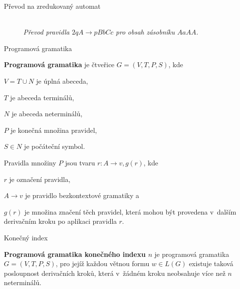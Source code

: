 \documentclass[a4paper,fyma3]{prosper}
\theoremstyle{definition}
\begin{document}
\begin{slide}{Převod na zredukovaný automat}

\bigskip
\bigskip
\bigskip

\begin{figure}[h!]
\centering
{} \bigskip \\
\emph{Převod pravidla $2 q A \rightarrow p BbCc$ pro obsah zásobníku $AaAA$.}
\end{figure}


\end{slide}


\begin{slide}{Programová gramatika}


\textbf{Programová gramatika} je čtveřice $G = (V,T,P,S)$, kde 

\begin{description*}
\item[$V = T \cup N$] je úplná abeceda, 
\item[$T$] je abeceda terminálů, 
\item[$N$] je abeceda neterminálů, 
\item[$P$] je konečná množina pravidel,
\item[$S \in N$] je počáteční symbol. 

\end{description*}

Pravidla množiny $P$ jsou tvaru $r \colon A \rightarrow v, g(r)$, kde 

\begin{description*}
\item[$r$] je označení pravidla, 
\item[$A \rightarrow v$] je pravidlo bezkontextové gramatiky a 
\item[$g(r)$] je množina značení těch pravidel, která mohou být provedena v~dalším derivačním kroku po aplikaci pravidla $r$.
\end{description*}


\end{slide}
\begin{slide}{Konečný index}

\bigskip


\textbf{Programová gramatika konečného indexu $n$} je programová gramatika $G = (V,T,P,S)$, pro jejíž každou větnou formu $w \in L(G)$ existuje taková posloupnost derivačních kroků, která v~žádném kroku neobsahuje více než $n$ neterminálů.


\end{slide}
\end{document}
